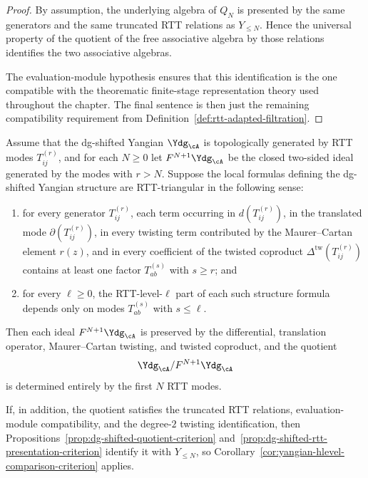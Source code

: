 \begin{proof}
By assumption, the underlying algebra of $Q_N$ is presented by the same
generators and the same truncated RTT relations as $Y_{\le N}$.  Hence
the universal property of the quotient of the free associative algebra
by those relations identifies the two associative algebras.

The evaluation-module hypothesis ensures that this identification is the
one compatible with the theorematic finite-stage representation theory
used throughout the chapter.  The final sentence is then just the
remaining compatibility requirement from
Definition~\ref{def:rtt-adapted-filtration}.
\end{proof}

\begin{proposition}
\label{prop:dg-shifted-rtt-locality-criterion}
Assume that the dg-shifted Yangian $\Ydg_{\cA}$ is topologically
generated by RTT modes $T_{ij}^{(r)}$, and for each $N \ge 0$ let
$F^{N+1}\Ydg_{\cA}$ be the closed two-sided ideal generated by the
modes with $r > N$.  Suppose the local formulas defining the
dg-shifted Yangian structure are RTT-triangular in the following sense:
\begin{enumerate}[label=\textup{(\roman*)}]
\item for every generator $T_{ij}^{(r)}$, each term occurring in
  $d(T_{ij}^{(r)})$, in the translated mode $\partial(T_{ij}^{(r)})$,
  in every twisting term contributed by the Maurer--Cartan element
  $r(z)$, and in every coefficient of the twisted coproduct
  $\Delta^{\mathrm{tw}}(T_{ij}^{(r)})$ contains at least one factor
  $T_{ab}^{(s)}$ with $s \ge r$; and
\item for every $\ell \ge 0$, the RTT-level-$\ell$ part of each such
  structure formula depends only on modes $T_{ab}^{(s)}$ with
  $s \le \ell$.
\end{enumerate}
Then each ideal $F^{N+1}\Ydg_{\cA}$ is preserved by the differential,
translation operator, Maurer--Cartan twisting, and twisted coproduct,
and the quotient
\[
\Ydg_{\cA}/F^{N+1}\Ydg_{\cA}
\]
is determined entirely by the first $N$ RTT modes.

If, in addition, the quotient satisfies the truncated RTT relations,
evaluation-module compatibility, and the degree-$2$ twisting
identification, then
Propositions~\ref{prop:dg-shifted-quotient-criterion}
and~\ref{prop:dg-shifted-rtt-presentation-criterion} identify it with
$Y_{\le N}$, so
Corollary~\ref{cor:yangian-hlevel-comparison-criterion} applies.
\end{proposition}

